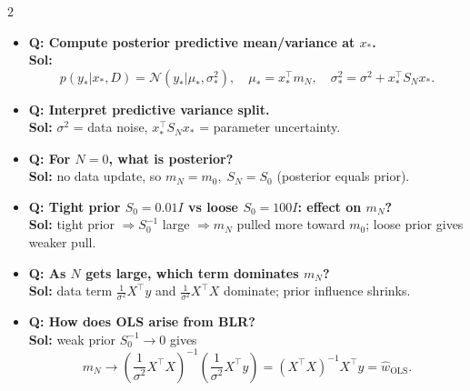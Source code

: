 \documentclass[10pt,fleqn]{article}
\begin{document}
\begin{multicols}{2}
\begin{itemize}
  \textbf{Sol:}
  \[
  p(w|X,y,\sigma^2)=\mathcal N(w|m_N,S_N),
  \]
  \[
  S_N=\left(S_0^{-1}+\frac1{\sigma^2}X^\top X\right)^{-1},\quad
  m_N=S_N\left(S_0^{-1}m_0+\frac1{\sigma^2}X^\top y\right).
  \]
  \item \textbf{Q: Compute posterior predictive mean/variance at \(x_*\).}\\
  \textbf{Sol:}
  \[
  p(y_*|x_*,D)=\mathcal N(y_*|\mu_*,\sigma_*^2),\quad
  \mu_*=x_*^\top m_N,\quad
  \sigma_*^2=\sigma^2+x_*^\top S_Nx_*.
  \]
  \item \textbf{Q: Interpret predictive variance split.}\\
  \textbf{Sol:} \(\sigma^2\) = data noise, \(x_*^\top S_Nx_*\) = parameter uncertainty.
  \item \textbf{Q: For \(N=0\), what is posterior?}\\
  \textbf{Sol:} no data update, so \(m_N=m_0,\;S_N=S_0\) (posterior equals prior).
  \item \textbf{Q: Tight prior \(S_0=0.01I\) vs loose \(S_0=100I\): effect on \(m_N\)?}\\
  \textbf{Sol:} tight prior \(\Rightarrow S_0^{-1}\) large \(\Rightarrow m_N\) pulled more toward \(m_0\); loose prior gives weaker pull.
  \item \textbf{Q: As \(N\) gets large, which term dominates \(m_N\)?}\\
  \textbf{Sol:} data term \(\frac1{\sigma^2}X^\top y\) and \(\frac1{\sigma^2}X^\top X\) dominate; prior influence shrinks.
  \item \textbf{Q: How does OLS arise from BLR?}\\
  \textbf{Sol:} weak prior \(S_0^{-1}\to 0\) gives
  \[
  m_N\to\left(\frac1{\sigma^2}X^\top X\right)^{-1}\left(\frac1{\sigma^2}X^\top y\right)
  =(X^\top X)^{-1}X^\top y=\hat w_{\text{OLS}}.
  \]
\end{itemize}


\end{multicols}
\end{document}
